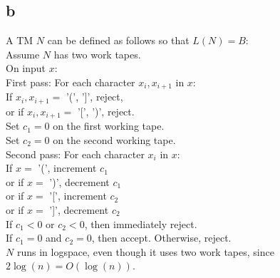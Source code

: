 \documentclass[letterpaper,notitlepage,twoside]{article}
\newcommand\tab[1][1cm]{\hspace*{#1}} %
\begin{document}
\subsection*{b}
A TM $N$ can be defined as follows so that $L(N) = B$: \\
Assume $N$ has two work tapes. \\
On input $x$: \\
\tab First pass: For each character $x_i, x_{i + 1}$ in $x$: \\
\tab\tab If $x_i, x_{i + 1} = $ '(', ']', reject, \\
\tab\tab or if $x_i, x_{i + 1} = $ '[', ')', reject. \\

Set $c_1 = 0$ on the first working tape. \\
Set $c_2 = 0$ on the second working tape. \\
\tab Second pass: For each character $x_i$ in $x$: \\
\tab\tab If $x = $ '(', increment $c_1$ \\
\tab\tab or if $x = $ ')', decrement $c_1$ \\
\tab\tab or if $x = $ '[', increment $c_2$ \\ 
\tab\tab or if $x = $ ']', decrement $c_2$ \\
\tab\tab If $c_1 < 0$ or $c_2 < 0$, then immediately reject. \\
\tab If $c_1 = 0$ and $c_2 = 0$, then accept. Otherwise, reject. \\

$N$ runs in logspace, even though it uses two work tapes, since $2\log(n) = O(\log(n))$.
\end{document}

